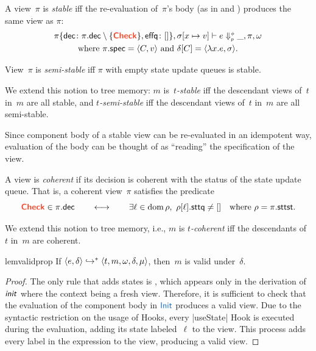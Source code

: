 \begin{defn}\label{def:stability}
  A view~$\pi$ is \emph{stable} iff the re-evaluation of~$\pi$'s body (as in  and ) produces the same view as $\pi$:
  \begin{multline*}
    \Step[\pi\{\fv{dec}{\pi.\field{dec}\setminus\{\dec{Check}\}},\fv{effq}{[]}\}, \sigma[x\mapsto v]]{e}{\_, \pi, \omega} \\
    \text{where $\pi.\field{spec} = \<C,v\>$ and $\delta[C] = \<\lambda x.e,\sigma\>$.}
  \end{multline*}

  View~$\pi$ is \emph{semi-stable} iff $\pi$ with empty state update queues is stable.

  We extend this notion to tree memory:
  $m$ is~\emph{$t$-stable} iff the descendant views of~$t$ in~$m$ are all stable, and \emph{$t$-semi-stable} iff the descendant views of~$t$ in~$m$ are all semi-stable.

  Since component body of a stable view can be re-evaluated in an idempotent way, evaluation of the body can be thought of as ``reading'' the specification of the view.
\end{defn}

\begin{defn}[Coherence]\label{def:coherence}
  A view is \emph{coherent} if its decision is coherent with the status of the state update queue.
  That is, a coherent view~$\pi$ satisfies the predicate
  \[
    \dec{Check} \in \pi.\field{dec}
    \qquad\longleftrightarrow\qquad
    \exists \ell \in \domain \rho,\ \rho[\ell].\field{sttq} \neq []
    \quad \text{where $\rho = \pi.\field{sttst}$.}
  \]

  We extend this notion to tree memory, i.e., $m$ is \emph{$t$-coherent} iff the descendants of~$t$ in~$m$ are coherent.
\end{defn}

\begin{restatable}{lem}{validprop}\label{lem:valid}
  If $\langle e,\delta\rangle \hookrightarrow^* \langle t,m,\omega,\delta,\mu\rangle$, then~$m$ is valid under~$\delta$.
\end{restatable}

\begin{proof}
  The only rule that adds states is ,
  which appears only in the derivation of $\textsf{\textit{init}}$ where the context being a fresh view.
  Therefore, it is sufficient to check that the evaluation of the component body in $\phase{Init}$ produces a valid view.
  Due to the syntactic restriction on the usage of Hooks, every |useState| Hook is executed during the evaluation, adding its state labeled~$\ell$ to the view.
  This process adds every label in the expression to the view, producing a valid view.
\end{proof}

